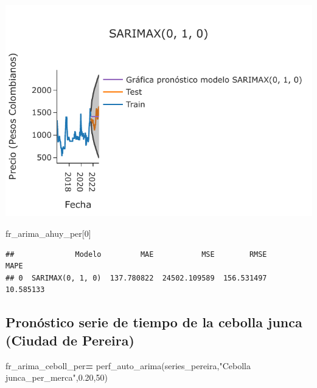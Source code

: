 \documentclass[
]{book}
\newenvironment{Shaded}{\begin{snugshade}}{\end{snugshade}}
\newcommand{\DecValTok}[1]{\textcolor[rgb]{0.00,0.00,0.81}{#1}}
\newcommand{\FloatTok}[1]{\textcolor[rgb]{0.00,0.00,0.81}{#1}}
\newcommand{\NormalTok}[1]{#1}
\newcommand{\OperatorTok}[1]{\textcolor[rgb]{0.81,0.36,0.00}{\textbf{#1}}}
\newcommand{\StringTok}[1]{\textcolor[rgb]{0.31,0.60,0.02}{#1}}
\begin{document}
\includegraphics{bookdown-demo_files/figure-latex/unnamed-chunk-161-155.pdf}

\begin{Shaded}
\begin{Highlighting}[]

\NormalTok{fr\_arima\_ahuy\_per[}\DecValTok{0}\NormalTok{]}
\end{Highlighting}
\end{Shaded}

\begin{verbatim}
##              Modelo         MAE           MSE        RMSE       MAPE
## 0  SARIMAX(0, 1, 0)  137.780822  24502.109589  156.531497  10.585133
\end{verbatim}

\hypertarget{pronuxf3stico-serie-de-tiempo-de-la-cebolla-junca-ciudad-de-pereira-1}{%
\subsection{Pronóstico serie de tiempo de la cebolla junca (Ciudad de Pereira)}\label{pronuxf3stico-serie-de-tiempo-de-la-cebolla-junca-ciudad-de-pereira-1}}

\begin{Shaded}
\begin{Highlighting}[]

\NormalTok{fr\_arima\_ceboll\_per}\OperatorTok{=}\NormalTok{ perf\_auto\_arima(series\_pereira,}\StringTok{"Cebolla junca\_per\_merca"}\NormalTok{,}\FloatTok{0.20}\NormalTok{,}\DecValTok{50}\NormalTok{)}
\end{Highlighting}
\end{Shaded}
\end{document}
